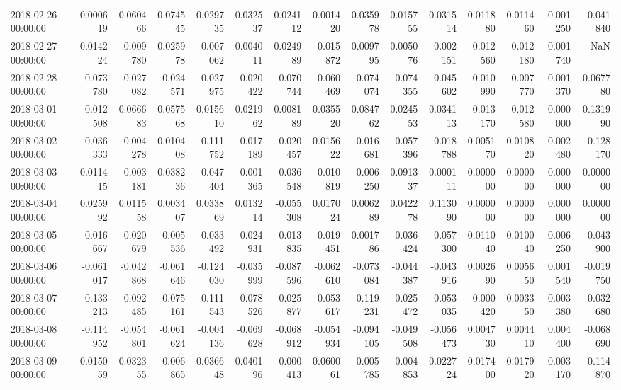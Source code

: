 \begin{tabular}{lrrrrrrrrrrrrrr}
2018-02-26 00:00:00 & 0.000619 & 0.060466 & 0.074545 & 0.029735 & 0.032537 & 0.024112 & 0.001420 & 0.035978 & 0.015755 & 0.031514 & 0.011880 & 0.011460 & 0.001250 & -0.041840 \\
2018-02-27 00:00:00 & 0.014224 & -0.009780 & 0.025978 & -0.007062 & 0.004011 & 0.024989 & -0.015872 & 0.009795 & 0.005076 & -0.002151 & -0.012560 & -0.012180 & 0.001740 & NaN \\
2018-02-28 00:00:00 & -0.073780 & -0.027082 & -0.024571 & -0.027975 & -0.020422 & -0.070744 & -0.060469 & -0.074074 & -0.074355 & -0.045602 & -0.010990 & -0.007770 & 0.001370 & 0.067780 \\
2018-03-01 00:00:00 & -0.012508 & 0.066683 & 0.057568 & 0.015610 & 0.021962 & 0.008189 & 0.035520 & 0.084762 & 0.024553 & 0.034113 & -0.013170 & -0.012580 & 0.000000 & 0.131990 \\
2018-03-02 00:00:00 & -0.036333 & -0.004278 & 0.010408 & -0.111752 & -0.017189 & -0.020457 & 0.015622 & -0.016681 & -0.057396 & -0.018788 & 0.005170 & 0.010820 & 0.002480 & -0.128170 \\
2018-03-03 00:00:00 & 0.011415 & -0.003181 & 0.038236 & -0.047404 & -0.001365 & -0.036548 & -0.010819 & -0.006250 & 0.091337 & 0.000111 & 0.000000 & 0.000000 & 0.000000 & 0.000000 \\
2018-03-04 00:00:00 & 0.025992 & 0.011558 & 0.003407 & 0.033869 & 0.013214 & -0.055308 & 0.017024 & 0.006289 & 0.042278 & 0.113090 & 0.000000 & 0.000000 & 0.000000 & 0.000000 \\
2018-03-05 00:00:00 & -0.016667 & -0.020679 & -0.005536 & -0.033492 & -0.024931 & -0.013835 & -0.019451 & 0.001786 & -0.036424 & -0.057300 & 0.011040 & 0.010040 & 0.006250 & -0.043900 \\
2018-03-06 00:00:00 & -0.061017 & -0.042868 & -0.061646 & -0.124030 & -0.035999 & -0.087596 & -0.062610 & -0.073084 & -0.044387 & -0.043916 & 0.002690 & 0.005650 & 0.001540 & -0.019750 \\
2018-03-07 00:00:00 & -0.133213 & -0.092485 & -0.075161 & -0.111543 & -0.078526 & -0.025877 & -0.053617 & -0.119231 & -0.025472 & -0.053035 & -0.000420 & 0.003350 & 0.003380 & -0.032680 \\
2018-03-08 00:00:00 & -0.114952 & -0.054801 & -0.061624 & -0.004136 & -0.069628 & -0.068912 & -0.054934 & -0.094105 & -0.049508 & -0.056473 & 0.004730 & 0.004410 & 0.004400 & -0.068690 \\
2018-03-09 00:00:00 & 0.015059 & 0.032355 & -0.006865 & 0.036648 & 0.040196 & -0.000413 & 0.060061 & -0.005785 & -0.004853 & 0.022724 & 0.017400 & 0.017920 & 0.003170 & -0.114870 \\

\end{tabular}

